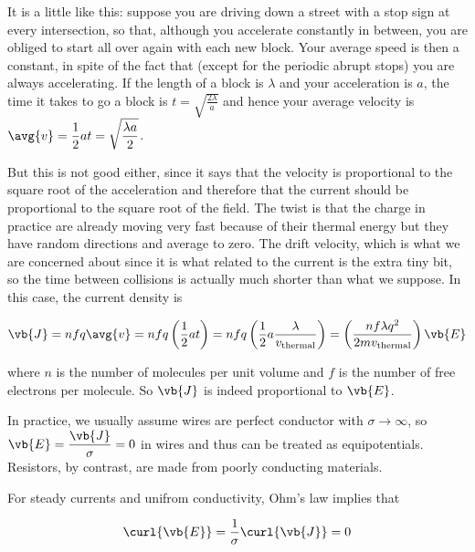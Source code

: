 \documentclass[english,a4paper,12pt]{report}
\begin{document}
It is a little like this: suppose you are driving down a street with a stop sign at every intersection, so that, although you accelerate constantly in between, you are obliged to start all over again with each new block. Your average speed is then a constant, in spite of the fact that (except for the periodic abrupt stops) you are always accelerating. If the length of a block is \(\lambda \)  and your acceleration is \(a\), the time it takes to go a block is \(\displaystyle t=\sqrt{\frac{2\lambda }{a} }\) and hence your average velocity is \(\displaystyle \avg{v} = \frac{1}{2} at = \sqrt{\frac{\lambda a}{2} }  \). 

But this is not good either, since it says that the velocity is proportional to the square root of the acceleration and therefore that the current should be proportional to the square root of the field. The twist is that the charge in practice are already moving very fast because of their thermal energy but they have random directions and average to zero. The drift velocity, which is what we are concerned about since it is what related to the current is the extra tiny bit, so the time between collisions is actually much shorter than what we suppose. In this case, the current density is

\begin{equation}
    \vb{J} = nfq\avg{v} = nfq \left( \frac{1}{2}at \right) = nfq \left( \frac{1}{2}a\frac{\lambda}{v_{\text{thermal} } }  \right) = \left( \frac{nf\lambda q^2}{2mv_{\text{thermal} } }  \right) \vb{E}  
\end{equation}

where \(n\) is the number of molecules per unit volume and \(f\) is the number of free electrons per molecule. So \(\vb{J} \) is indeed proportional to \(\vb{E} \).  

In practice, we usually assume wires are perfect conductor with \(\sigma \rightarrow \infty\), so \(\displaystyle \vb{E} = \frac{\vb{J} }{\sigma } =0\) in wires and thus can be treated as equipotentials. Resistors, by contrast, are made from poorly conducting materials. 

For steady currents and unifrom conductivity, Ohm's law implies that 

\begin{equation}
    \curl{\vb{E} } = \frac{1}{\sigma } \curl{\vb{J} } = 0  
\end{equation}
 
\end{document}
